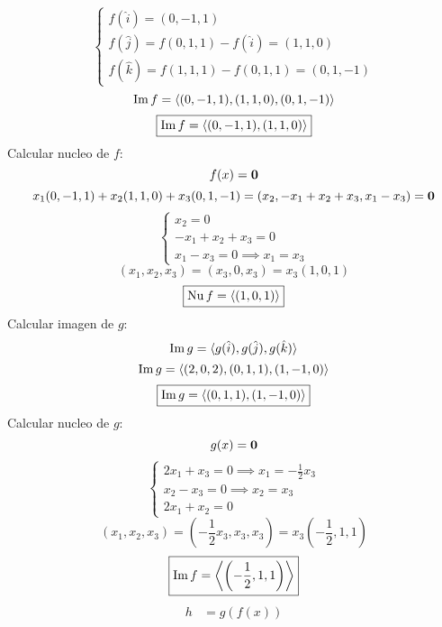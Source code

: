 \documentclass[../practica.root.tex]{subfiles}
\begin{document}
\begin{enumerate}
\begin{enumerate}
\[\begin{cases}
                            f(\hat{i}) = (0, -1, 1)                      \\
                            f(\hat{j}) = f(0,1,1)-f(\hat{i}) = (1, 1, 0) \\
                            f(\hat{k}) = f(1,1,1)-f(0,1,1) = (0,1,-1)
                        \end{cases}
                    \] \[
                        \operatorname{Im} f = \langle (0,-1,1),(1,1,0),(0,1,-1) \rangle
                    \] \[
                        \boxed{\operatorname{Im} f = \langle (0,-1,1),(1,1,0) \rangle}
                    \]
                    Calcular nucleo de $f$:
                    \[ f(x) = \mathbf{0} \]
                    \[ x_1(0,-1,1) + x_2(1,1,0) + x_3(0,1,-1) = (x_2,-x_1+x_2+x_3,x_1-x_3) = \mathbf{0} \]
                    \[
                        \begin{cases}
                            x_2 = 0              \\
                            -x_1 + x_2 + x_3 = 0 \\
                            x_1 - x_3 = 0 \implies x_1 = x_3
                        \end{cases}
                    \]
                    \[ (x_1,x_2,x_3) = (x_3,0,x_3) = x_3(1,0,1) \]
                    \[ \boxed{\operatorname{Nu} f = \langle (1,0,1) \rangle} \]
                    Calcular imagen de $g$:
                    \[ \operatorname{Im} g = \langle g(\hat{i}),g(\hat{j}),g(\hat{k}) \rangle \]
                    \[ \operatorname{Im} g = \langle (2,0,2),(0,1,1),(1,-1,0) \rangle \]
                    \[ \boxed{\operatorname{Im} g = \langle (0,1,1),(1,-1,0) \rangle} \]
                    Calcular nucleo de $g$:
                    \[
                        g(x) = \mathbf{0}
                    \] \[
                        \begin{cases}
                            2x_1 + x_3 = 0 \implies x_1 = -\frac{1}{2}x_3 \\
                            x_2 - x_3 = 0 \implies x_2 = x_3              \\
                            2x_1 + x_2 = 0
                        \end{cases}
                    \] \[
                        (x_1, x_2, x_3) = \left(-\frac{1}{2}x_3, x_3, x_3\right) = x_3\left(-\frac{1}{2},1,1\right)
                    \] \[
                        \boxed{\operatorname{Im} f = \left\langle \left(-\frac{1}{2},1,1\right) \right\rangle }
                    \]
                    \begin{align*}
                        h & = g(f(x))                                                        \\

\end{align*}
\end{enumerate}
\end{enumerate}
\end{document}
